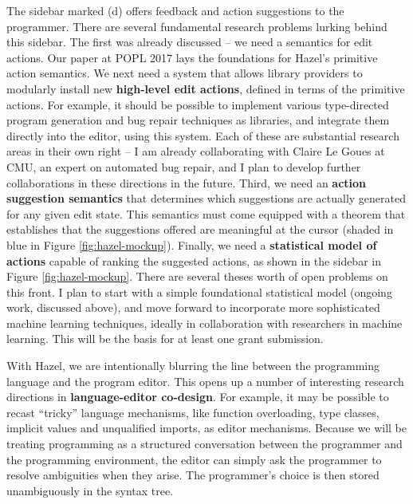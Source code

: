 \documentclass[9pt]{extarticle}
\begin{document}
The sidebar marked (d) offers feedback and action suggestions to the programmer. There are several fundamental research problems lurking behind this sidebar. The first was already discussed -- we need a semantics for edit actions. Our paper at POPL 2017 lays the foundations for Hazel's primitive action semantics. We next need a system that allows library providers to modularly install new \textbf{high-level edit actions}, defined in terms of the primitive actions. For example, it should be possible to implement various type-directed program generation and bug repair techniques as libraries, and integrate them directly into the editor, using this system. Each of these are substantial research areas in their own right -- I am already collaborating with Claire Le Goues at CMU, an expert on automated bug repair, and I plan to develop further collaborations in these directions in the future. Third, we need an \textbf{action suggestion semantics} that determines which suggestions are actually generated for any given edit state. This semantics must come equipped with a theorem that establishes that the suggestions offered are meaningful at the cursor (shaded in blue in Figure \ref{fig:hazel-mockup}).  Finally, we need a \textbf{statistical model of actions} capable of ranking the suggested actions, as shown in the sidebar in Figure \ref{fig:hazel-mockup}. There are several theses worth of open problems on this front. I plan to start with a simple foundational statistical model (ongoing work, discussed above), and move forward to incorporate more sophisticated machine learning techniques, ideally in collaboration with researchers in machine learning. This will be the basis for at least one grant submission.



With Hazel, we are intentionally blurring the line between the programming language and the program editor. This opens up a number of interesting research directions in \textbf{language-editor co-design}. For example, it may be possible to recast  ``tricky'' language mechanisms, like function overloading, type classes, implicit values and unqualified imports, as editor mechanisms. Because we will be treating programming as a structured conversation between the programmer and the programming environment, the editor can simply ask the programmer to resolve ambiguities when they arise. The programmer's choice is then stored unambiguously in the syntax tree. %
\end{document}
